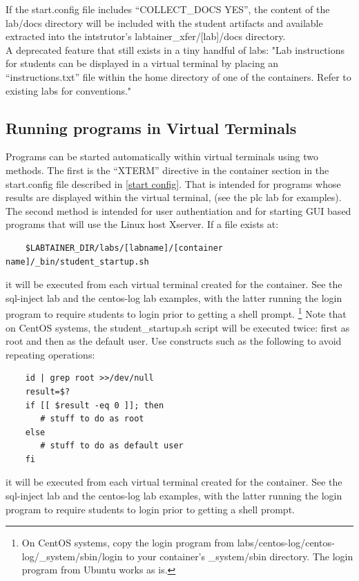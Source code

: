 \documentclass[12pt]{article}
\begin{document}
\noindent If the start.config file includes ``COLLECT\_DOCS YES'', the content of the lab/docs directory will be
included with the student artifacts and available extracted into the intstrutor's 
labtainer\_xfer/[lab]/docs directory. \\

\noindent A deprecated feature that still exists in a tiny handful of labs: "Lab instructions for students can be displayed in a virtual terminal by placing an
``instructions.txt'' file within the home directory of one of the containers.  Refer to existing
labs for conventions."  


\subsection {Running programs in Virtual Terminals}
\label {student start}
Programs can be started automatically within virtual terminals using two methods.
The first is the ``XTERM'' directive in the container section in the start.config file
described in \ref{start config}.  That is intended for programs whose results are displayed
within the virtual terminal, (see the plc lab for examples).  The second method is 
intended for user authentiation and for starting GUI based programs
that will use the Linux host Xserver.  If a file exists at:
\begin{verbatim}
    $LABTAINER_DIR/labs/[labname]/[container name]/_bin/student_startup.sh
\end{verbatim}
it will be executed from each virtual terminal created for the container.
See the sql-inject lab and the centos-log lab examples, with the latter
running the login program to require students to login prior to getting a shell prompt.
\footnote{On CentOS systems, copy the login program from labs/centos-log/centos-log/\_system/sbin/login
to your container's \_system/sbin directory. The login program from Ubuntu works as is.}
Note that on CentOS systems, the student\_startup.sh script will be executed twice: first
as root and then as the default user.  Use constructs such as the following to avoid repeating
operations:
\begin{verbatim}
    id | grep root >>/dev/null
    result=$?
    if [[ $result -eq 0 ]]; then
       # stuff to do as root
    else
       # stuff to do as default user
    fi
\end{verbatim}
it will be executed from each virtual terminal created for the container.
See the sql-inject lab and the centos-log lab examples, with the latter
running the login program to require students to login prior to getting a shell prompt.
\end{document}
